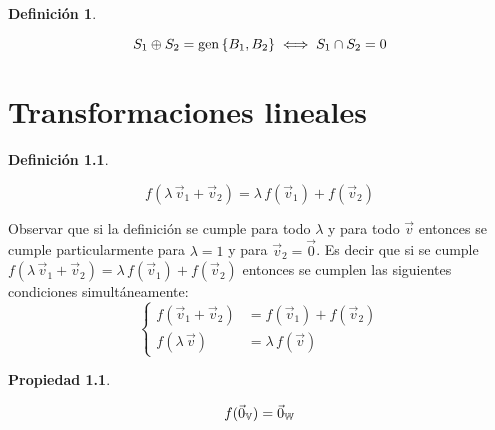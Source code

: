 \documentclass[a5paper,12pt,twoside]{book}
\newtheorem{defn}{{Definición}}[chapter]
\newtheorem{prop}{{Propiedad}}[chapter]
\begin{document}
\begin{mdframed}[style=MyFrame1]
    \begin{defn}
    \end{defn}
    \begin{equation*}
        S_1 \oplus S_2 = \operatorname{gen} { \left\{ {B_1 , B_2} \right\} } \iff S_1 \cap S_2 = 0
    \end{equation*}
\end{mdframed}


\chapter{Transformaciones lineales}
\label{cha:TL}

\begin{mdframed}[style=MyFrame1]
    \begin{defn}
        \label{defn:TL}
    \end{defn}
    \begin{equation*}
        f(\lambda \, \Vec{v}_1 + \Vec{v}_2) = \lambda \, f(\Vec{v}_1) + f(\Vec{v}_2)
    \end{equation*}
\end{mdframed}

Observar que si la definición se cumple para todo $\lambda$ y para todo $\Vec{v}$ entonces se cumple particularmente para $\lambda=1$ y para $\Vec{v}_2=\Vec{0}$. Es decir que si se cumple $f(\lambda \, \Vec{v}_1 + \Vec{v}_2)=\lambda \, f(\Vec{v}_1) + f(\Vec{v}_2)$ entonces se cumplen las siguientes condiciones simultáneamente:
\begin{equation*}
    \left\{
    \begin{aligned}
        f(\Vec{v}_1 + \Vec{v}_2) &= f(\Vec{v}_1) + f(\Vec{v}_2)
        \\
        f(\lambda \, \Vec{v}) &= \lambda \, f(\Vec{v})
    \end{aligned}
    \right.
\end{equation*}

\begin{mdframed}[style=MyFrame1]
    \begin{prop}
    \end{prop}
    \begin{equation*}
        f(\Vec{0}_{\mathbb{V}}) = \Vec{0}_{\mathbb{W}}
    \end{equation*}
\end{mdframed}
\end{document}
